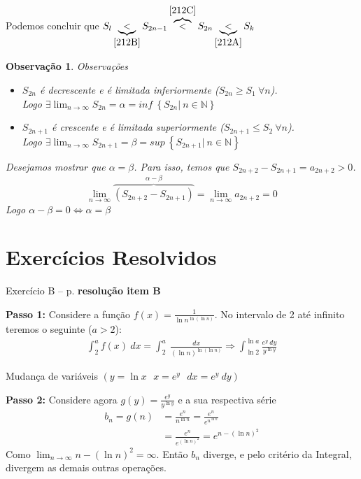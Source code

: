 \documentclass[12pt,openany]{book}
\newtheorem{obs}{Observação}
\newcommand{\LI}[1][n]{\lim_{{#1} \rightarrow \infty}}
\begin{document}
Podemos concluir que $S_l \underbrace{<}_{\ref{212B}} S_{2n-1} \overbrace{<}^{\ref{212C}} S_{2n} \underbrace{<}_{\ref{212A}} S_k$

\begin{obs}{Observações}
\begin{itemize}
\item $S_{2n}$ é decrescente e é limitada inferiormente ($S_{2n} \geq S_1 \ \forall n$). \\
Logo $\exists \displaystyle{\lim_{n \rightarrow \infty} S_{2n} = \alpha = inf \ \left\{S_{2n} | \ n \in \mathds{N}\right\} }$
\item $S_{2n+1}$ é crescente e é limitada superiormente ($S_{2n+1} \leq S_2 \ \forall n$). \\
Logo $\exists \displaystyle{\lim_{n \rightarrow \infty} S_{2n+1} = \beta = sup \ \left\{S_{2n+1} | \ n \in \mathds{N}\right\} }$
\end{itemize}

Desejamos mostrar que $\alpha = \beta$. Para isso, temos que $S_{2n+2} - S_{2n+1} = a_{2n+2} > 0$. 
$$\lim_{n \rightarrow \infty} \overbrace{\left(S_{2n+2} - S_{2n+1}\right)}^{\alpha - \beta} = \lim_{n \rightarrow \infty} a_{2n+2} = 0$$
Logo $\alpha - \beta = 0 \Longleftrightarrow \alpha = \beta$
\end{obs}

\section{Exercícios Resolvidos}
 
Exercício B -- p. \pageref{avaliar}
\textbf{resolução item B}

\textbf{Passo 1:} Considere a função $\displaystyle{f(x) = \frac{1}{\ln n^{\ln(\ln n)}}}$. No intervalo de 2 até infinito teremos o seguinte ($a > 2$): \begin{align*}
\int_2^a f(x) \ dx = \int_2^a \ \frac{dx}{(\ln n)^{\ln(\ln n)}}
\Rightarrow \int_{\ln 2}^{\ln a} \frac{e^y \ dy}{y^{\ln y}} \label{ob:2-11}
\end{align*}

 Mudança de variáveis $(y = \ln x  \ \ \ x = e^y \ \ \ dx = e^y \ dy)$

\vspace{5mm}

\textbf{Passo 2:} Considere agora $g(y) = \frac{e^y}{y^{\ln y}}$ e a sua respectiva série 
\begin{align*}
b_n = g(n) &= \frac{e^n}{n^{\ln n}} = \frac{e^n}{e^{n^{\ln n}}} \\
&= \frac{e^n}{e^{(\ln n)^2}} = e^{n - (\ln n)^2}
\end{align*}
Como $\displaystyle{\LI n - (\ln n)^2 = \infty}$. Então $b_n$ diverge, e pelo critério da Integral, divergem as demais outras operações.
\end{document}
